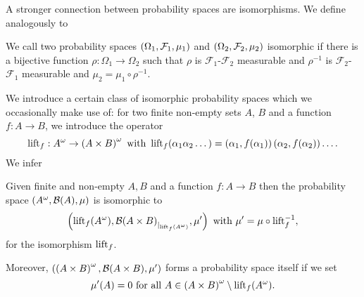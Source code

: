 A stronger connection between probability spaces are isomorphisms. We define
analogously to \cite[Definition 8.34]{Klenke}
\begin{definition}
  We call two probability spaces $\left(\Omega_{1}, \mathcal{F}_{1}, \mu_{1}\right)$
  and $\left(\Omega_{2}, \mathcal{F}_{2}, \mu_{2}\right)$ isomorphic if there is a
  bijective function $\rho:\Omega_{1}\rightarrow\Omega_{2}$ such that
  $\rho$ is $\mathcal{F}_{1}$-$\mathcal{F}_{2}$ measurable and $\rho^{-1}$ is
  $\mathcal{F}_{2}$-$\mathcal{F}_{1}$ measurable and 
  $\mu_{2} = \mu_{1}\circ\rho^{-1}$.
\end{definition}
We introduce a certain class of isomorphic probability spaces which we
occasionally make use of: for two finite non-empty sets $A$, $B$ and
a function $f:A\rightarrow B$, we introduce the operator
\begin{equation*}
  \operatorname{lift}_{f}:A^{\omega}\rightarrow\left(A\times B\right)^{\omega}
  \text{ with }\operatorname{lift}_{f}(\alpha_{1}\alpha_{2}\dots) = 
    \left(\alpha_{1}, f(\alpha_{1})\right)\left(\alpha_{2}, f(\alpha_{2})\right)\dots.
\end{equation*}
We infer
\begin{lemma}
  Given finite and non-empty $A, B$ and a function $f:A\rightarrow B$ then the
  probability space $\left(A^{\omega}, \mathcal{B}(A), \mu\right)$ is isomorphic to
  \begin{equation*}
    \left(\operatorname{lift}_{f}(A^{\omega}), 
      {\mathcal{B}(A\times B)}_{|_{\operatorname{lift}_{f}(A^{\omega})}}, \mu'
    \right) \text{ with } \mu' = \mu\circ\operatorname{lift}_{f}^{-1},
  \end{equation*}
  for the isomorphism $\operatorname{lift}_{f}$.

  Moreover, $\left(\left(A\times B\right)^{\omega}, \mathcal{B}(A\times B),
  \mu'\right)$ forms a probability space itself if we set
  \begin{equation*}
    \mu'(A) = 0\text{ for all }A\in
    \left(A\times B\right)^{\omega}\setminus\operatorname{lift}_{f}(A^{\omega}).
  \end{equation*}
  \label{lem:liftisomorphism}
\end{lemma}
